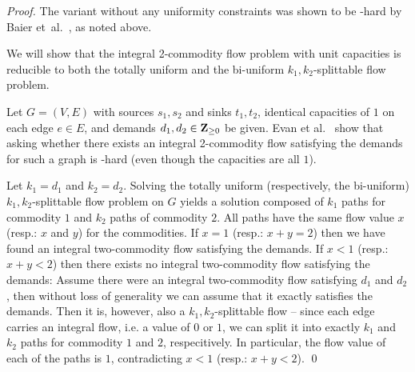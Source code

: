 \begin{proof}
  The variant without any uniformity constraints was shown to be \NP-hard
  by Baier et~al.~\cite{baier-koehler-skutella:05}, as noted above.

  We will show that the integral 2-commodity flow problem with unit
  capacities is reducible to both the totally uniform and the
  bi-uniform $k_1,k_2$-splittable flow problem.
  
  Let $G=(V,E)$ with sources $s_1,s_2$ and sinks $t_1,t_2$, identical
  capacities of $1$ on each edge $e\in E$, and demands $d_1,d_2\in\mathbf{Z}_{\geq0}$
  be given. Evan et al.~\cite{even-itai-shamir:76} show that asking
  whether there exists an integral 2-commodity flow satisfying the
  demands for such a graph is \NP-hard (even
  though  the capacities are all $1$). 

  Let $k_1=d_1$ and $k_2=d_2$. Solving the totally uniform
  (respectively, the bi-uniform) $k_1,k_2$-splittable flow problem on
  $G$ yields a solution composed of $k_1$ paths for commodity $1$ and
  $k_2$ paths of commodity $2$. All paths have the same flow value $x$
  (resp.: $x$ and $y$) for the commodities. If $x=1$ (resp.: $x+y=2$)
  then we have found an integral two-commodity flow satisfying the
  demands.  If $x<1$ (resp.: $x+y<2$) then there exists no
  integral two-commodity flow satisfying the demands: Assume there
  were an integral two-commodity flow satisfying $d_1$ and $d_2$, then
  without loss of generality we can assume that it exactly satisfies
  the demands. Then it is, however, also a $k_1,k_2$-splittable flow
  -- since each edge carries an integral flow, i.e. a value of $0$ or $1$,
  we can split it into exactly $k_1$ and $k_2$ paths for commodity $1$
  and $2$, respecitively.  In particular, the flow value of each of
  the paths is $1$, contradicting $x<1$ (resp.: $x+y<2$).
\qed\end{proof}

